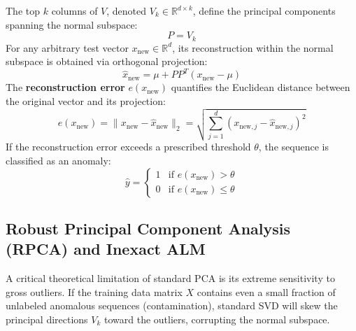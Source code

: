 The top $k$ columns of $V$, denoted $V_k \in \mathbb{R}^{d \times k}$, define the principal components spanning the normal subspace:
\begin{equation}
    P = V_k
\end{equation}
For any arbitrary test vector $x_{\text{new}} \in \mathbb{R}^d$, its reconstruction within the normal subspace is obtained via orthogonal projection:
\begin{equation}
    \hat{x}_{\text{new}} = \mu + P P^T (x_{\text{new}} - \mu)
\end{equation}
The \textbf{reconstruction error} $e(x_{\text{new}})$ quantifies the Euclidean distance between the original vector and its projection:
\begin{equation}
    e(x_{\text{new}}) = \| x_{\text{new}} - \hat{x}_{\text{new}} \|_2 = \sqrt{ \sum_{j=1}^d (x_{\text{new}, j} - \hat{x}_{\text{new}, j})^2 }
\end{equation}
If the reconstruction error exceeds a prescribed threshold $\theta$, the sequence is classified as an anomaly:
\begin{equation}
    \hat{y} = \begin{cases}
        1 & \text{if } e(x_{\text{new}}) > \theta \\
        0 & \text{if } e(x_{\text{new}}) \le \theta
    \end{cases}
\end{equation}

\subsection{Robust Principal Component Analysis (RPCA) and Inexact ALM}
\label{subsec:rpca_foundations}
A critical theoretical limitation of standard PCA is its extreme sensitivity to gross outliers. If the training data matrix $X$ contains even a small fraction of unlabeled anomalous sequences (contamination), standard SVD will skew the principal directions $V_k$ toward the outliers, corrupting the normal subspace.

